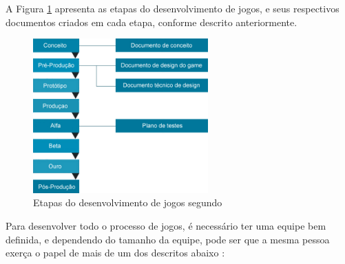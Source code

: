 \documentclass[quali]{ppgccufscar}
\begin{document}
A Figura \ref{fig_jogos} apresenta as etapas do desenvolvimento de jogos, e seus respectivos documentos criados em cada etapa, conforme descrito anteriormente.

\begin{figure}[!htbp]
	\begin{center}
	\caption{Etapas do desenvolvimento de jogos segundo }
	\label{fig_jogos}
	\includegraphics[width=0.6\textwidth,natwidth=598,natheight=528]{figura0.jpg}
	\end{center}
\end{figure}

Para desenvolver todo o processo de jogos, é necessário ter uma equipe bem definida, e dependendo do tamanho da equipe, pode ser que a mesma pessoa exerça o papel de mais de um dos descritos abaixo \cite{novak2012}:
\end{document}
